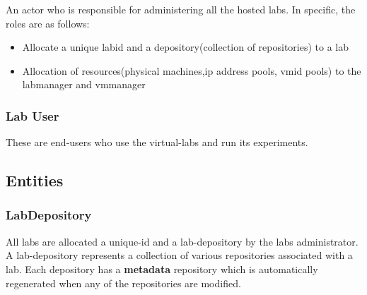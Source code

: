\documentclass[11pt]{article}
\begin{document}
   An actor who is responsible for administering all the hosted
   labs. In specific, the roles are as follows:
\begin{itemize}
\item Allocate a unique labid and a depository(collection of
       repositories) to a lab
\item Allocation of resources(physical machines,ip address pools,
       vmid pools) to the labmanager and vmmanager
\end{itemize}
\subsubsection{Lab User}
\label{sec-3.1.3}

   These are end-users who use the virtual-labs and run its
   experiments.
\subsection{Entities}
\label{sec-3.2}

\subsubsection{LabDepository}
\label{sec-3.2.1}


     All labs are allocated a unique-id and a lab-depository by the
     labs administrator. A lab-depository represents a collection of
     various repositories associated with a lab. Each depository has a
     \textbf{metadata} repository which is automatically regenerated when any
     of the repositories are modified.
\end{document}
